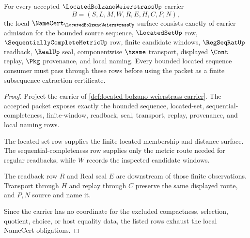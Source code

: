 \begin{theorem}
\label{thm:located-bolzano-weierstrass-carrier-obligations}
For every accepted $\LocatedBolzanoWeierstrassUp$ carrier
$$
B=(S,L,M,W,R,E,H,C,P,N),
$$
the local $\NameCert_{\LocatedBolzanoWeierstrassUp}$ surface consists exactly of carrier admission for the bounded source sequence, $\LocatedSetUp$ row, $\SequentiallyCompleteMetricUp$ row, finite candidate windows, $\RegSeqRatUp$ readback, $\RealUp$ seal, componentwise $\hsame$ transport, displayed $\Cont$ replay, $\Pkg$ provenance, and local naming. Every bounded located sequence consumer must pass through these rows before using the packet as a finite subsequence-extraction certificate.
\end{theorem}
\begin{proof}
Project the carrier of \autoref{def:located-bolzano-weierstrass-carrier}. The accepted packet exposes exactly the bounded sequence, located-set, sequential-completeness, finite-window, readback, seal, transport, replay, provenance, and local naming rows.

The located-set row supplies the finite located membership and distance surface. The sequential-completeness row supplies only the metric route needed for regular readbacks, while $W$ records the inspected candidate windows.

The readback row $R$ and Real seal $E$ are downstream of those finite observations. Transport through $H$ and replay through $C$ preserve the same displayed route, and $P,N$ source and name it.

Since the carrier has no coordinate for the excluded compactness, selection, quotient, choice, or host equality data, the listed rows exhaust the local NameCert obligations.
\end{proof}

